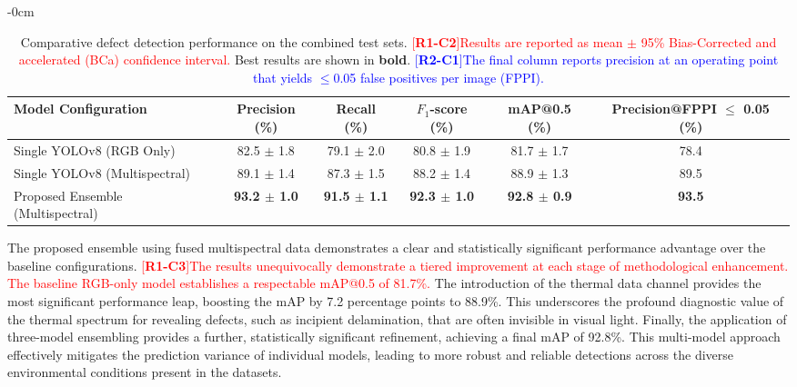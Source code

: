 \documentclass[energies,article,submit,pdftex,moreauthors]{Definitions/mdpi}
\newcommand{\revtag}[2]{[\textbf{R#1-C#2}]}
\newcommand{\Rone}[1]{\textcolor{red}{#1}}
\newcommand{\Rtwo}[1]{\textcolor{blue}{#1}}
\begin{document}
\begin{table}[H]
\caption{Comparative defect detection performance on the combined test sets. \Rone{\revtag{1}{2}Results are reported as mean \(\pm\) 95\% Bias-Corrected and accelerated (BCa) confidence interval.} Best results are shown in \textbf{bold}. \Rtwo{\revtag{2}{1}The final column reports precision at an operating point that yields \(\leq\)0.05 false positives per image (FPPI).}}
\label{tab:detection_performance}
\begin{adjustwidth}{-\extralength}{0cm}
\centering
\begin{tabular*}{\linewidth}{@{\extracolsep{\fill}} l ccccc}
\toprule
\textbf{Model Configuration} & \textbf{Precision (\%)} & \textbf{Recall (\%)} & \textbf{\(F_{1}\)-score (\%)} & \textbf{mAP@0.5 (\%)} & \parbox{2.5cm}{\centering\textbf{Precision@FPPI \(\leq\) 0.05 (\%)}} \\
\midrule
Single YOLOv8 (RGB Only) & 82.5 \(\pm\) 1.8 & 79.1 \(\pm\) 2.0 & 80.8 \(\pm\) 1.9 & 81.7 \(\pm\) 1.7 & 78.4 \\
Single YOLOv8 (Multispectral) & 89.1 \(\pm\) 1.4 & 87.3 \(\pm\) 1.5 & 88.2 \(\pm\) 1.4 & 88.9 \(\pm\) 1.3 & 89.5 \\
Proposed Ensemble (Multispectral) & \textbf{93.2 \(\pm\) 1.0} & \textbf{91.5 \(\pm\) 1.1} & \textbf{92.3 \(\pm\) 1.0} & \textbf{92.8 \(\pm\) 0.9} & \textbf{93.5} \\
\bottomrule
\end{tabular*}
\end{adjustwidth}
\end{table}

The proposed ensemble using fused multispectral data demonstrates a clear and statistically significant performance advantage over the baseline configurations. \Rone{\revtag{1}{3}The results unequivocally demonstrate a tiered improvement at each stage of methodological enhancement. The baseline RGB-only model establishes a respectable mAP@0.5 of 81.7\%.} The introduction of the thermal data channel provides the most significant performance leap, boosting the mAP by 7.2 percentage points to 88.9\%. This underscores the profound diagnostic value of the thermal spectrum for revealing defects, such as incipient delamination, that are often invisible in visual light. Finally, the application of three-model ensembling provides a further, statistically significant refinement, achieving a final mAP of 92.8\%. This multi-model approach effectively mitigates the prediction variance of individual models, leading to more robust and reliable detections across the diverse environmental conditions present in the datasets.
\end{document}
